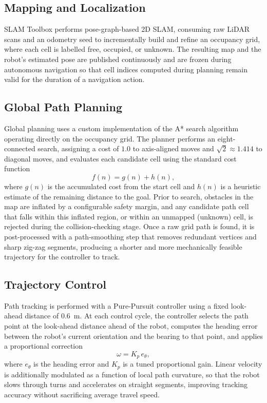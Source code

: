 \documentclass[10pt,twocolumn]{article}
\begin{document}
\subsection{Mapping and Localization}
SLAM Toolbox performs pose-graph-based 2D SLAM, consuming raw LiDAR scans and an odometry seed to incrementally build and refine an occupancy grid, where each cell is labelled free, occupied, or unknown. The resulting map and the robot's estimated pose are published continuously and are frozen during autonomous navigation so that cell indices computed during planning remain valid for the duration of a navigation action.

\subsection{Global Path Planning}
Global planning uses a custom implementation of the A* search algorithm operating directly on the occupancy grid. The planner performs an eight-connected search, assigning a cost of $1.0$ to axis-aligned moves and $\sqrt{2}\approx1.414$ to diagonal moves, and evaluates each candidate cell using the standard cost function
\begin{equation}
f(n) = g(n) + h(n),
\end{equation}
where $g(n)$ is the accumulated cost from the start cell and $h(n)$ is a heuristic estimate of the remaining distance to the goal. Prior to search, obstacles in the map are inflated by a configurable safety margin, and any candidate path cell that falls within this inflated region, or within an unmapped (unknown) cell, is rejected during the collision-checking stage. Once a raw grid path is found, it is post-processed with a path-smoothing step that removes redundant vertices and sharp zig-zag segments, producing a shorter and more mechanically feasible trajectory for the controller to track.

\subsection{Trajectory Control}
Path tracking is performed with a Pure-Pursuit controller using a fixed look-ahead distance of 0.6~m. At each control cycle, the controller selects the path point at the look-ahead distance ahead of the robot, computes the heading error between the robot's current orientation and the bearing to that point, and applies a proportional correction
\begin{equation}
\omega = K_p \, e_\theta,
\end{equation}
where $e_\theta$ is the heading error and $K_p$ is a tuned proportional gain. Linear velocity is additionally modulated as a function of local path curvature, so that the robot slows through turns and accelerates on straight segments, improving tracking accuracy without sacrificing average travel speed.
\end{document}
